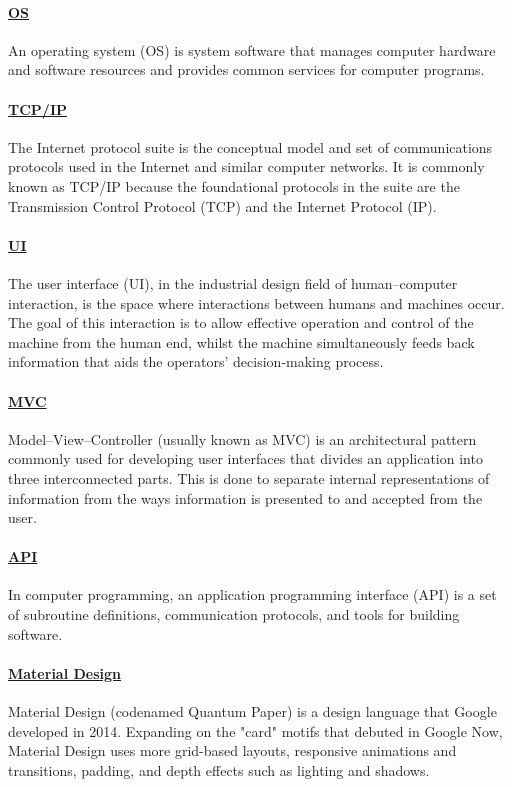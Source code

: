\documentclass[10pt]{article}
\begin{document}
\paragraph{\underline{OS}} An operating system (OS) is system software that manages computer hardware and software resources and provides common services for computer programs.

\paragraph{\underline{TCP/IP}} The Internet protocol suite is the conceptual model and set of communications protocols used in the Internet and similar computer networks. It is commonly known as TCP/IP because the foundational protocols in the suite are the Transmission Control Protocol (TCP) and the Internet Protocol (IP).

\paragraph{\underline{UI}} The user interface (UI), in the industrial design field of human–computer interaction, is the space where interactions between humans and machines occur. The goal of this interaction is to allow effective operation and control of the machine from the human end, whilst the machine simultaneously feeds back information that aids the operators' decision-making process.

\paragraph{\underline{MVC}} Model–View–Controller (usually known as MVC) is an architectural pattern commonly used for developing user interfaces that divides an application into three interconnected parts. This is done to separate internal representations of information from the ways information is presented to and accepted from the user.

\paragraph{\underline{API}} In computer programming, an application programming interface (API) is a set of subroutine definitions, communication protocols, and tools for building software.

\paragraph{\underline{Material Design}} Material Design (codenamed Quantum Paper) is a design language that Google developed in 2014. Expanding on the "card" motifs that debuted in Google Now, Material Design uses more grid-based layouts, responsive animations and transitions, padding, and depth effects such as lighting and shadows.
\end{document}

